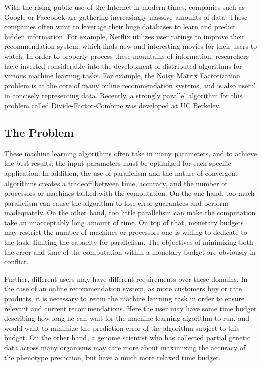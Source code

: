 With the rising public use of the Internet in modern times, companies 
such as Google or Facebook are gathering increasingly massive amounts 
of data. These companies often want to leverage their huge databases to 
learn and predict hidden information. For example, Netflix utilizes user 
ratings to improve their recommendation system, which finds new and 
interesting movies for their users to watch. In order to properly 
process these mountains of information, researchers have invested
considerable into the development of distributed algorithms for 
various machine learning tasks. For example, the Noisy Matrix Factorization 
problem is at the core of many online recommendation systems, and is
also useful in concisely representing data. Recently, a strongly parallel 
algorithm for this problem called Divide-Factor-Combine was developed 
at UC Berkeley\cite{MTJ13}. 

\subsection{The Problem}
These machine learning algorithms often take in many parameters, and
to achieve the best results, the input parameters must be optimized for
each specific application. In addition, the use of parallelism and the
nature of convergent algorithms creates a tradeoff between time, accuracy,
and the number of processors or machines tasked with the computation. 
On the one hand, too much parallelism can cause the algorithm to lose 
error guarantees and perform inadequately. On the other hand, too 
little parallelism can make the computation take an unacceptably long 
amount of time. On top of that, monetary budgets may restrict the number
of machines or processors one is willing to dedicate to the task, limiting
the capacity for parallelism. The objectives of minimizing both the error 
and time of the computation within a monetary budget are obviously 
in conflict.

Further, different users may have different requirements over these 
domains. In the case of an online recommendation system, as more 
customers buy or rate products, it is necessary to rerun the machine 
learning task in order to ensure relevant and current recommendations. 
Here the user may have some time budget describing how long he can wait 
for the machine learning algorithm to run, and would want to minimize 
the prediction error of the algorithm subject to this budget. On the other
hand, a genome scientist who has collected partial genetic data 
across many organisms may care more about maximizing the accuracy of the
phenotype prediction, but have a much more relaxed time budget. 


